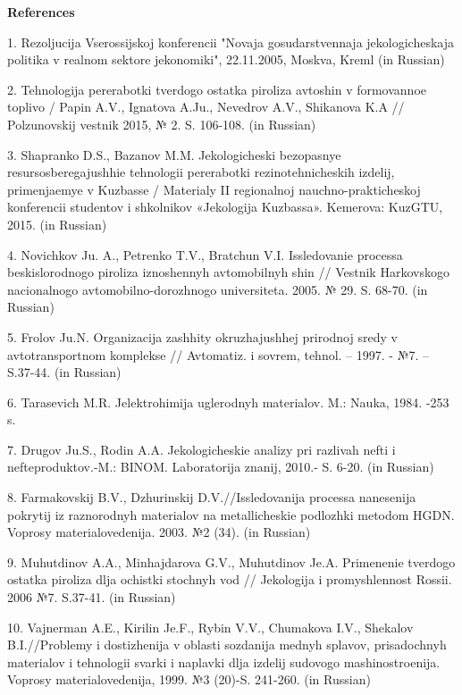 \textbf{References}

1. Rezoljucija Vserossijskoj konferencii "Novaja gosudarstvennaja
jekologicheskaja politika v real\textquotesingle nom sektore
jekonomiki", 22.11.2005, Moskva, Kreml\textquotesingle{} (in Russian)

2. Tehnologija pererabotki tverdogo ostatka piroliza avtoshin v
formovannoe toplivo / Papin A.V., Ignatova A.Ju., Nevedrov A.V.,
Shikanova K.A // Polzunovskij vestnik 2015, № 2. S. 106-108. (in
Russian)

3. Shapranko D.S., Bazanov M.M. Jekologicheski bezopasnye
resursosberegajushhie tehnologii pererabotki rezinotehnicheskih izdelij,
primenjaemye v Kuzbasse / Materialy II regional\textquotesingle noj
nauchno-prakticheskoj konferencii studentov i
shkol\textquotesingle nikov «Jekologija Kuzbassa». Kemerova: KuzGTU,
2015. (in Russian)

4. Novichkov Ju. A., Petrenko T.V., Bratchun V.I. Issledovanie processa
beskislorodnogo piroliza iznoshennyh avtomobil\textquotesingle nyh shin
// Vestnik Har\textquotesingle kovskogo nacional\textquotesingle nogo
avtomobil\textquotesingle no-dorozhnogo universiteta. 2005. № 29. S.
68-70. (in Russian)

5. Frolov Ju.N. Organizacija zashhity okruzhajushhej prirodnoj sredy v
avtotransportnom komplekse // Avtomatiz. i sovrem, tehnol. -- 1997. -
№7. -- S.37-44. (in Russian)

6. Tarasevich M.R. Jelektrohimija uglerodnyh materialov. M.: Nauka,
1984. -253 s.

7. Drugov Ju.S., Rodin A.A. Jekologicheskie analizy pri razlivah nefti i
nefteproduktov.-M.: BINOM. Laboratorija znanij, 2010.- S. 6-20. (in
Russian)

8. Farmakovskij B.V., Dzhurinskij D.V.//Issledovanija processa
nanesenija pokrytij iz raznorodnyh materialov na metallicheskie
podlozhki metodom HGDN. Voprosy materialovedenija. 2003. №2 (34). (in
Russian)

9. Muhutdinov A.A., Minhajdarova G.V., Muhutdinov Je.A. Primenenie
tverdogo ostatka piroliza dlja ochistki stochnyh vod // Jekologija i
promyshlennost\textquotesingle{} Rossii. 2006 №7. S.37-41. (in Russian)

10. Vajnerman A.E., Kirilin Je.F., Rybin V.V., Chumakova I.V., Shekalov
B.I.//Problemy i dostizhenija v oblasti sozdanija mednyh splavov,
prisadochnyh materialov i tehnologii svarki i naplavki dlja izdelij
sudovogo mashinostroenija. Voprosy materialovedenija, 1999. №3 (20)-S.
241-260. (in Russian)

